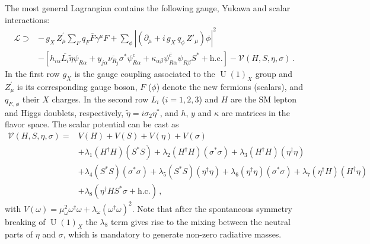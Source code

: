 \documentclass[12pt]{article}
\begin{document}
The most general Lagrangian contains the following gauge, Yukawa and scalar interactions:
%
\begin{align}
\label{eq:LagY}
    \mathcal{L} \supset& -\,g_{X}\,Z_\mu^\prime\sum_{F}q_{F}\overline{F} \gamma^\mu F+\sum_{\phi}\left|\left( \partial_\mu +i\,g_{X}\,q_\phi\,Z'_\mu \right) \phi\right|^2\nonumber\\
    &-[ 
    h_{i\alpha} \overline{L_{i}} \tilde{\eta} \psi_{R\alpha} +  y_{j\alpha} \overline{\nu_{R_{j}}} \sigma^* \psi^c_{R\alpha} + \kappa_{\alpha\beta} \overline{\psi^{c}_{R\alpha}} \psi_{R\beta} S^* + \text{h.c.}] - \mathcal{V}(H, S, \eta, \sigma)\,.
\end{align}
%
In the first row $g_{X}$ is the gauge coupling associated to the $\operatorname{U}(1)_X$ group and $Z_\mu^\prime$ is its corresponding gauge boson, $F$ ($\phi$) denote the new fermions (scalars), and $q_{F,\,\phi}$ their $X$ charges. In the second row
$L_{i}$ ($i=1,2,3$) and $H$ are the SM lepton and Higgs doublets, respectively,  $\widetilde{\eta} = i \sigma_2 \eta^*$, and $h$, $y$ and $\kappa$ are matrices in the flavor space. 
The scalar potential can be cast as
%
\begin{align}
    \mathcal{V}(H, S, \eta, \sigma) = & V(H) + V(S) + V(\eta) + V(\sigma) \nonumber\\
    &+  \lambda_{1} (H^{\dagger} H ) (S^{*} S) + \lambda_{2} (H^{\dagger} H ) (\sigma^{*} \sigma ) + \lambda_{3} (H^{\dagger} H ) (\eta^{\dagger} \eta )\nonumber\\
    &+ \lambda_{4} (S^{*} S) (\sigma^{*} \sigma ) + \lambda_{5} (S^{*} S) (\eta^{\dagger} \eta ) + \lambda_{6} (\eta^{\dagger} \eta ) (\sigma^{*} \sigma ) + \lambda_{7} (\eta^{\dagger} H ) (H^{\dagger} \eta ) \nonumber\\
    &+ \lambda_{8} (\eta^{\dagger} H S^{*} \sigma + \text{h.c.})\,,
\end{align}
%
%
%
with $V(\omega) = \mu^{2}_{\omega} \omega^{\dagger} \omega + \lambda_{\omega} (\omega^{\dagger} \omega)^{2}$. 
Note that after the spontaneous symmetry breaking of $\operatorname{U}(1)_X$ the $\lambda_8$ term gives rise to the mixing between the neutral parts of $\eta$ and $\sigma$, which is mandatory to generate non-zero radiative masses. 
\end{document}
